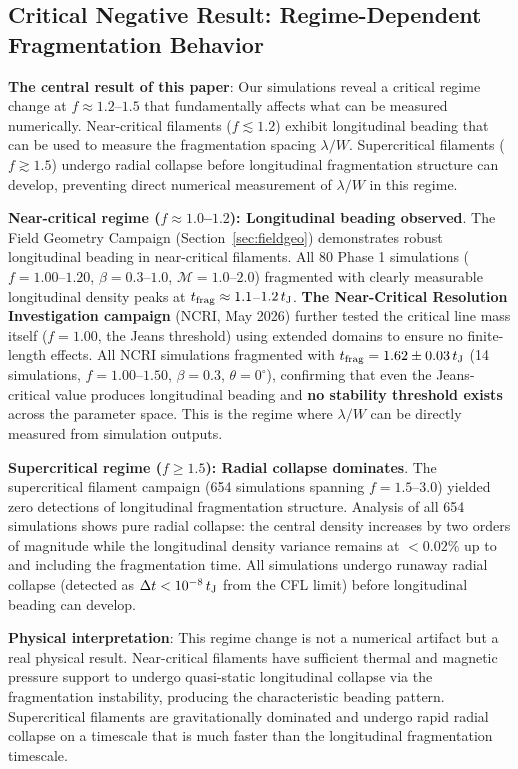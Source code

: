 \documentclass[twoside,twocolumn]{mnras}
\begin{document}
\subsection{Critical Negative Result: Regime-Dependent Fragmentation Behavior}

\textbf{The central result of this paper}: Our simulations reveal a critical regime change at $f \approx 1.2$--$1.5$ that fundamentally affects what can be measured numerically. Near-critical filaments ($f \lesssim 1.2$) exhibit longitudinal beading that can be used to measure the fragmentation spacing $\lambda/W$. Supercritical filaments ($f \gtrsim 1.5$) undergo radial collapse before longitudinal fragmentation structure can develop, preventing direct numerical measurement of $\lambda/W$ in this regime.

\textbf{Near-critical regime ($f \approx 1.0$--$1.2$): Longitudinal beading observed}. The Field Geometry Campaign (Section~\ref{sec:fieldgeo}) demonstrates robust longitudinal beading in near-critical filaments. All 80 Phase 1 simulations ($f = 1.00$--$1.20$, $\beta = 0.3$--$1.0$, $\mathcal{M} = 1.0$--$2.0$) fragmented with clearly measurable longitudinal density peaks at $t_{\rm frag} \approx 1.1$--$1.2\,t_{\rm J}$. \textbf{The Near-Critical Resolution Investigation campaign} (NCRI, May 2026) further tested the critical line mass itself ($f = 1.00$, the Jeans threshold) using extended domains to ensure no finite-length effects. All NCRI simulations fragmented with $t_{\rm frag} = 1.62 \pm 0.03\,t_{\rm J}$ (14 simulations, $f = 1.00$--$1.50$, $\beta = 0.3$, $\theta = 0^{\circ}$), confirming that even the Jeans-critical value produces longitudinal beading and \textbf{no stability threshold exists} across the parameter space. This is the regime where $\lambda/W$ can be directly measured from simulation outputs.

\textbf{Supercritical regime ($f \geq 1.5$): Radial collapse dominates}. The supercritical filament campaign (654 simulations spanning $f = 1.5$--$3.0$) yielded zero detections of longitudinal fragmentation structure. Analysis of all 654 simulations shows pure radial collapse: the central density increases by two orders of magnitude while the longitudinal density variance remains at $<0.02\%$ up to and including the fragmentation time. All simulations undergo runaway radial collapse (detected as $\Delta t < 10^{-8}\,t_{\rm J}$ from the CFL limit) before longitudinal beading can develop.

\textbf{Physical interpretation}: This regime change is not a numerical artifact but a real physical result. Near-critical filaments have sufficient thermal and magnetic pressure support to undergo quasi-static longitudinal collapse via the fragmentation instability, producing the characteristic beading pattern. Supercritical filaments are gravitationally dominated and undergo rapid radial collapse on a timescale that is much faster than the longitudinal fragmentation timescale.
\end{document}
